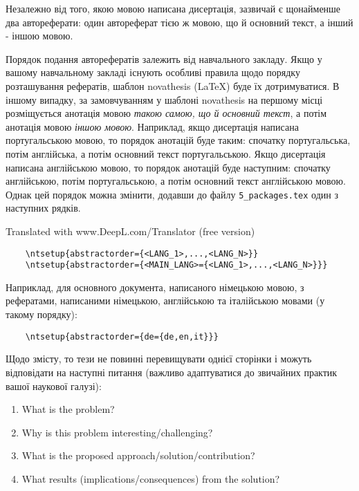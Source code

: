 

Незалежно від того, якою мовою написана дисертація, зазвичай є щонайменше два автореферати: один автореферат тією ж мовою, що й основний текст, а інший - іншою мовою.

Порядок подання авторефератів залежить від навчального закладу.  Якщо у вашому навчальному закладі існують особливі правила щодо порядку розташування рефератів, шаблон \gls{novathesis} (\LaTeX) буде їх дотримуватися.  В іншому випадку, за замовчуванням у шаблоні \gls{novathesis} на першому місці розміщується анотація мовою \emph{такою самою, що й основний текст}, а потім анотація мовою \emph{іншою мовою}. Наприклад, якщо дисертація написана португальською мовою, то порядок анотацій буде таким: спочатку португальська, потім англійська, а потім основний текст португальською. Якщо дисертація написана англійською мовою, то порядок анотацій буде наступним: спочатку англійською, потім португальською, а потім основний текст англійською мовою.
%
Однак цей порядок можна змінити, додавши до файлу \verb+5_packages.tex+ один з наступних рядків.

Translated with www.DeepL.com/Translator (free version)

\begin{verbatim}
    \ntsetup{abstractorder={<LANG_1>,...,<LANG_N>}}
    \ntsetup{abstractorder={<MAIN_LANG>={<LANG_1>,...,<LANG_N>}}}
\end{verbatim}

Наприклад, для основного документа, написаного німецькою мовою, з рефератами, написаними німецькою, англійською та італійською мовами (у такому порядку):

\begin{verbatim}
    \ntsetup{abstractorder={de={de,en,it}}}
\end{verbatim}

Щодо змісту, то тези не повинні перевищувати однієї сторінки і можуть відповідати на наступні питання (важливо адаптуватися до звичайних практик вашої наукової галузі):

\begin{enumerate}
  \item What is the problem?
  \item Why is this problem interesting/challenging?
  \item What is the proposed approach/solution/contribution?
  \item What results (implications/consequences) from the solution?
\end{enumerate}

